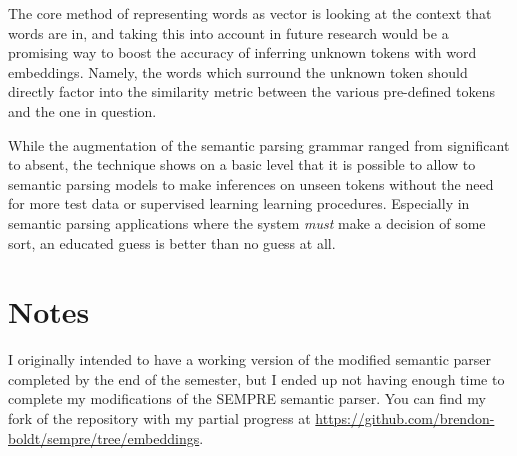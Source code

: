 \documentclass[a4paper]{article}
\begin{document}
The core method of representing words as vector is looking at the context that
words are in, and taking this into account in future research would be a 
promising way to boost the accuracy of inferring unknown tokens with word
embeddings. Namely, the words which surround the unknown token should directly
factor into the similarity metric between the various pre-defined tokens and
the one in question.

While the augmentation of the semantic parsing grammar ranged
from significant to absent, the technique shows on a basic level that it
is possible to allow to semantic parsing models to make inferences on
unseen tokens without the need for more test data or supervised learning
learning procedures. Especially in semantic parsing applications where the
system \textit{must} make a decision of some sort, an educated guess is better
than no guess at all.


{}


\section{Notes}

I originally intended to have a working version of the modified semantic
parser completed by the end of the semester, but I ended up not having enough
time to complete my modifications of the SEMPRE semantic parser. You can
find my fork of the repository with my partial progress at
\url{https://github.com/brendon-boldt/sempre/tree/embeddings}.
\end{document}
